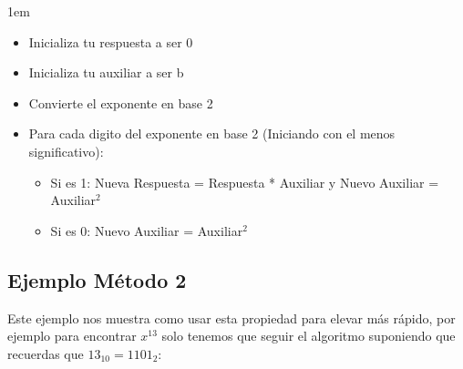 \documentclass[12pt]{report}                                    %
\newenvironment{SmallIndentation}[1][0.75em]                    %
    {\begin{adjustwidth}{#1}{}\begin{footnotesize}}                 %
    {\end{footnotesize}\end{adjustwidth}}                           %
\begin{document}
            \begin{SmallIndentation}[1em]
                
                \begin{itemize}
                    \item   Inicializa tu respuesta a ser 0
                    \item   Inicializa tu auxiliar a ser b
                    \item   Convierte el exponente en base 2

                    \item Para cada digito del exponente en base 2 (Iniciando con
                          el menos significativo):
                        
                        \begin{itemize}
                            \item Si es 1:
                                    Nueva Respuesta = Respuesta * Auxiliar y Nuevo Auxiliar = Auxiliar$^2$
                            \item Si es 0:
                                    Nuevo Auxiliar = Auxiliar$^2$
                        \end{itemize}
                \end{itemize}

            \end{SmallIndentation}



        \subsection*{Ejemplo Método 2}

            Este ejemplo nos muestra como usar esta propiedad para elevar más rápido, por ejemplo para encontrar
            $x^{13}$ solo tenemos que seguir el algoritmo suponiendo que recuerdas que $13_{10} = 1101_{2}$:
\end{document}
